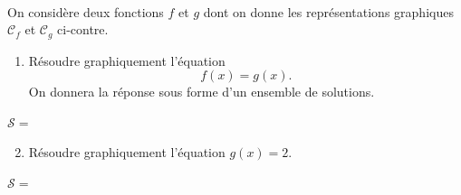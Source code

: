 \documentclass[11pt]{article}
\begin{document}
\begin{exo}~\\
    \begin{minipage}{.5\textwidth}
      On considère deux fonctions $f$ et $g$ dont on donne les représentations
      graphiques $\mathscr C_f$ et $\mathscr C_g$ ci-contre.
      \begin{enumerate}
        \item Résoudre graphiquement l'équation $$f(x)=g(x).$$ On donnera la
          réponse sous forme d'un ensemble de solutions.
      \end{enumerate} 
      $\mathscr S=$\dotfill
      \begin{enumerate}
          \setcounter{enumi}{1}
        \item Résoudre graphiquement l'équation $g(x)=2$.
      \end{enumerate}
      $\mathscr S=$\dotfill
  \end{minipage}
    \begin{minipage}{.5\textwidth}
    \begin{center}
    \end{center}
  \end{minipage}
\end{exo}
\end{document}
